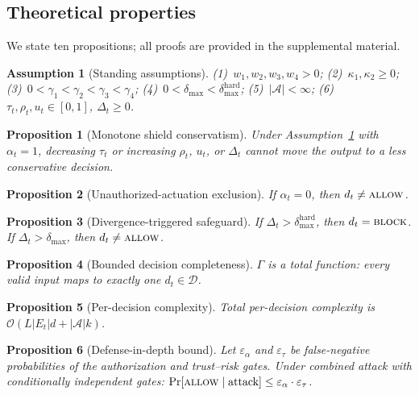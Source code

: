 \documentclass[lettersize,journal]{IEEEtran}
\newtheorem{proposition}{Proposition}
\newtheorem{assumption}{Assumption}
\begin{document}
\subsection{Theoretical properties}
\label{sec:theory}

We state ten propositions; all proofs are provided in the supplemental material.

\begin{assumption}[Standing assumptions]
\label{asm:standing}
(1)~$w_1, w_2, w_3, w_4 > 0$;
(2)~$\kappa_1, \kappa_2 \ge 0$;
(3)~$0 < \gamma_1 < \gamma_2 < \gamma_3 < \gamma_4$;
(4)~$0 < \delta_{\max} < \delta_{\max}^{\mathrm{hard}}$;
(5)~$|\mathcal{A}| < \infty$;
(6)~$\tau_t, \rho_t, u_t \in [0,1]$, $\Delta_t \ge 0$.
\end{assumption}

\begin{proposition}[Monotone shield conservatism]
\label{prop:monotone}
Under Assumption~\ref{asm:standing} with $\alpha_t=1$, decreasing $\tau_t$ or increasing $\rho_t$, $u_t$, or $\Delta_t$ cannot move the output to a less conservative decision.
\end{proposition}

\begin{proposition}[Unauthorized-actuation exclusion]
\label{prop:authz}
If $\alpha_t = 0$, then $d_t \neq \textup{\textsc{allow}}$.
\end{proposition}

\begin{proposition}[Divergence-triggered safeguard]
\label{prop:divergence}
If $\Delta_t > \delta_{\max}^{\mathrm{hard}}$, then $d_t = \textup{\textsc{block}}$.
If $\Delta_t > \delta_{\max}$, then $d_t \neq \textup{\textsc{allow}}$.
\end{proposition}

\begin{proposition}[Bounded decision completeness]
\label{prop:completeness}
$\Gamma$ is a total function: every valid input maps to exactly one $d_t \in \mathcal{D}$.
\end{proposition}

\begin{proposition}[Per-decision complexity]
\label{prop:complexity}
Total per-decision complexity is $\mathcal{O}(L|E_t|d + |\mathcal{A}|k)$.
\end{proposition}

\begin{proposition}[Defense-in-depth bound]
\label{prop:depth}
Let $\varepsilon_\alpha$ and $\varepsilon_\tau$ be false-negative probabilities of the authorization and trust--risk gates.
Under combined attack with conditionally independent gates: $\Pr[\textup{\textsc{allow}} \mid \text{attack}] \le \varepsilon_\alpha \cdot \varepsilon_\tau$.
\end{proposition}
\end{document}
